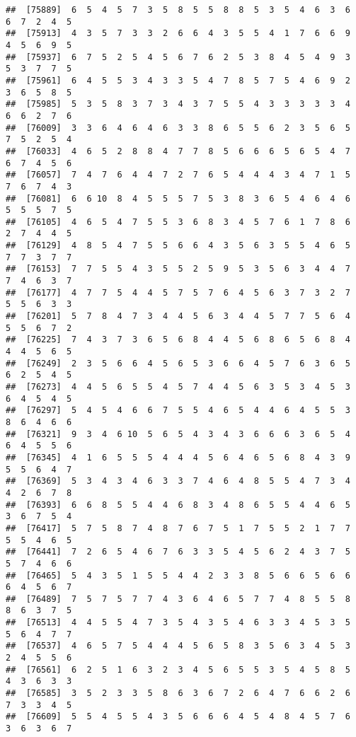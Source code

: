\documentclass[
]{book}
\begin{document}
\begin{verbatim}
##  [75889]  6  5  4  5  7  3  5  8  5  5  8  8  5  3  5  4  6  3  6  6  7  2  4  5
##  [75913]  4  3  5  7  3  3  2  6  6  4  3  5  5  4  1  7  6  6  9  4  5  6  9  5
##  [75937]  6  7  5  2  5  4  5  6  7  6  2  5  3  8  4  5  4  9  3  5  3  7  7  5
##  [75961]  6  4  5  5  3  4  3  3  5  4  7  8  5  7  5  4  6  9  2  3  6  5  8  5
##  [75985]  5  3  5  8  3  7  3  4  3  7  5  5  4  3  3  3  3  3  4  6  6  2  7  6
##  [76009]  3  3  6  4  6  4  6  3  3  8  6  5  5  6  2  3  5  6  5  7  5  2  5  4
##  [76033]  4  6  5  2  8  8  4  7  7  8  5  6  6  6  5  6  5  4  7  6  7  4  5  6
##  [76057]  7  4  7  6  4  4  7  2  7  6  5  4  4  4  3  4  7  1  5  7  6  7  4  3
##  [76081]  6  6 10  8  4  5  5  5  7  5  3  8  3  6  5  4  6  4  6  5  5  5  7  5
##  [76105]  4  6  5  4  7  5  5  3  6  8  3  4  5  7  6  1  7  8  6  2  7  4  4  5
##  [76129]  4  8  5  4  7  5  5  6  6  4  3  5  6  3  5  5  4  6  5  7  7  3  7  7
##  [76153]  7  7  5  5  4  3  5  5  2  5  9  5  3  5  6  3  4  4  7  7  4  6  3  7
##  [76177]  4  7  7  5  4  4  5  7  5  7  6  4  5  6  3  7  3  2  7  5  5  6  3  3
##  [76201]  5  7  8  4  7  3  4  4  5  6  3  4  4  5  7  7  5  6  4  5  5  6  7  2
##  [76225]  7  4  3  7  3  6  5  6  8  4  4  5  6  8  6  5  6  8  4  4  4  5  6  5
##  [76249]  2  3  5  6  6  4  5  6  5  3  6  6  4  5  7  6  3  6  5  6  2  5  4  5
##  [76273]  4  4  5  6  5  5  4  5  7  4  4  5  6  3  5  3  4  5  3  6  4  5  4  5
##  [76297]  5  4  5  4  6  6  7  5  5  4  6  5  4  4  6  4  5  5  3  8  6  4  6  6
##  [76321]  9  3  4  6 10  5  6  5  4  3  4  3  6  6  6  3  6  5  4  6  4  5  5  6
##  [76345]  4  1  6  5  5  5  4  4  4  5  6  4  6  5  6  8  4  3  9  5  5  6  4  7
##  [76369]  5  3  4  3  4  6  3  3  7  4  6  4  8  5  5  4  7  3  4  4  2  6  7  8
##  [76393]  6  6  8  5  5  4  4  6  8  3  4  8  6  5  5  4  4  6  5  3  6  7  5  4
##  [76417]  5  7  5  8  7  4  8  7  6  7  5  1  7  5  5  2  1  7  7  5  5  4  6  5
##  [76441]  7  2  6  5  4  6  7  6  3  3  5  4  5  6  2  4  3  7  5  5  7  4  6  6
##  [76465]  5  4  3  5  1  5  5  4  4  2  3  3  8  5  6  6  5  6  6  6  4  5  6  7
##  [76489]  7  5  7  5  7  7  4  3  6  4  6  5  7  7  4  8  5  5  8  8  6  3  7  5
##  [76513]  4  4  5  5  4  7  3  5  4  3  5  4  6  3  3  4  5  3  5  5  6  4  7  7
##  [76537]  4  6  5  7  5  4  4  4  5  6  5  8  3  5  6  3  4  5  3  2  4  5  5  6
##  [76561]  6  2  5  1  6  3  2  3  4  5  6  5  5  3  5  4  5  8  5  4  3  6  3  3
##  [76585]  3  5  2  3  3  5  8  6  3  6  7  2  6  4  7  6  6  2  6  7  3  3  4  5
##  [76609]  5  5  4  5  5  4  3  5  6  6  6  4  5  4  8  4  5  7  6  3  6  3  6  7

\end{verbatim}
\end{document}
